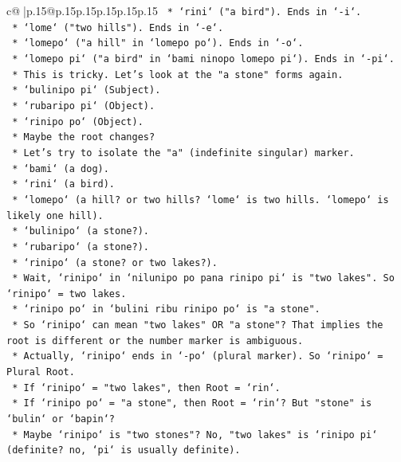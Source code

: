 \documentclass{article}
\begin{document}
{\begin{supertabular}{c@{$\;$}|p{.15\linewidth}@{}p{.15\linewidth}p{.15\linewidth}p{.15\linewidth}p{.15\linewidth}p{.15\linewidth}}
{{{\texttt{            *   `rini` ("a bird"). Ends in `{-}i`.} \\
\texttt{            *   `lome` ("two hills"). Ends in `{-}e`.} \\
\texttt{            *   `lomepo` ("a hill" in `lomepo po`). Ends in `{-}o`.} \\
\texttt{            *   `lomepo pi` ("a bird" in `bami ninopo lomepo pi`). Ends in `{-}pi`.} \\
\texttt{            *   This is tricky. Let's look at the "a stone" forms again.} \\
\texttt{                *   `bulinipo pi` (Subject).} \\
\texttt{                *   `rubaripo pi` (Object).} \\
\texttt{                *   `rinipo po` (Object).} \\
\texttt{            *   Maybe the root changes?} \\
\texttt{            *   Let's try to isolate the "a" (indefinite singular) marker.} \\
\texttt{            *   `bami` (a dog).} \\
\texttt{            *   `rini` (a bird).} \\
\texttt{            *   `lomepo` (a hill? or two hills? `lome` is two hills. `lomepo` is likely one hill).} \\
\texttt{            *   `bulinipo` (a stone?).} \\
\texttt{            *   `rubaripo` (a stone?).} \\
\texttt{            *   `rinipo` (a stone? or two lakes?).} \\
\texttt{            *   Wait, `rinipo` in `nilunipo po pana rinipo pi` is "two lakes". So `rinipo` = two lakes.} \\
\texttt{            *   `rinipo po` in `bulini ribu rinipo po` is "a stone".} \\
\texttt{            *   So `rinipo` can mean "two lakes" OR "a stone"? That implies the root is different or the number marker is ambiguous.} \\
\texttt{            *   Actually, `rinipo` ends in `{-}po` (plural marker). So `rinipo` = Plural Root.} \\
\texttt{            *   If `rinipo` = "two lakes", then Root = `rin`.} \\
\texttt{            *   If `rinipo po` = "a stone", then Root = `rin`? But "stone" is `bulin` or `bapin`?} \\
\texttt{            *   Maybe `rinipo` is "two stones"? No, "two lakes" is `rinipo pi` (definite? no, `pi` is usually definite).} \\
}}}
\end{supertabular}}
\end{document}
